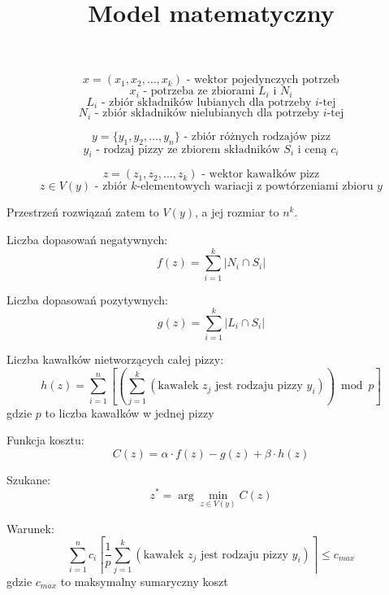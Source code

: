 \documentclass[a4paper,12pt]{article}
\title{Model matematyczny}
\date{}
\begin{document}
\centering

$$
    x = ( x_1, x_2, \dots, x_k ) \text{ - wektor pojedynczych potrzeb}
$$
$$
    x_i \text{ - potrzeba ze zbiorami $L_i$ i $N_i$}
$$
$$
    L_i \text{ - zbiór składników lubianych dla potrzeby $i$-tej}
$$
$$
    N_i \text{ - zbiór składników nielubianych dla potrzeby $i$-tej}
$$

$$
    y = \{ y_1, y_2, \dots, y_n \} \text{ - zbiór różnych rodzajów pizz}
$$
$$
    y_i \text{ - rodzaj pizzy ze zbiorem składników $S_i$ i ceną $c_i$}
$$

$$
    z = ( z_1, z_2, \dots, z_k ) \text{ - wektor kawałków pizz}
$$
$$
    z \in V(y) \text{ - zbiór $k$-elementowych wariacji z powtórzeniami zbioru $y$}
$$

Przestrzeń rozwiązań zatem to $V(y)$, a jej rozmiar to $n^k$.

Liczba dopasowań negatywnych:
$$
    f(z) = \sum_{i=1}^{k} | N_i \cap S_i |
$$

Liczba dopasowań pozytywnych:
$$
    g(z) = \sum_{i=1}^{k} \left| L_i \cap S_i \right|
$$

Liczba kawałków nietworzących całej pizzy:
$$
    h(z) = \sum_{i=1}^{n}
    \left[
        \left(
        \sum_{j=1}^{k}
        \left( \text{kawałek $z_j$ jest rodzaju pizzy $y_i$} \right)
        \right) \bmod{p}
        \right]
$$
gdzie $p$ to liczba kawałków w jednej pizzy

Funkcja kosztu:
$$
    C(z) = \alpha \cdot f(z) - g(z) + \beta \cdot h(z)
$$

Szukane:
$$
    z^* = \arg \min_{z \in V(y)} C(z)
$$

Warunek:
$$
    \sum_{i=1}^{n} c_i
    \left\lceil \frac{1}{p} \sum_{j=1}^{k}
    \left( \text{kawałek $z_j$ jest rodzaju pizzy $y_i$} \right)
    \right\rceil
    \leq c_{max}
$$
gdzie $c_{max}$ to maksymalny sumaryczny koszt
\end{document}
